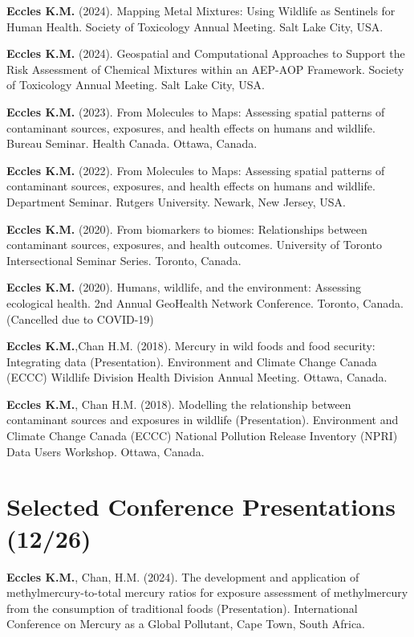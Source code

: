 \documentclass[margin,line]{res}
\begin{document}
\begin{resume}
\textbf{Eccles K.M.} (2024). Mapping Metal Mixtures: Using Wildlife as Sentinels for Human Health. Society of Toxicology Annual Meeting. Salt Lake City, USA.

\textbf{Eccles K.M.} (2024). Geospatial and Computational Approaches to Support the Risk Assessment of Chemical Mixtures within an AEP-AOP Framework. Society of Toxicology Annual Meeting. Salt Lake City, USA.

\textbf{Eccles K.M.} (2023). From Molecules to Maps: Assessing spatial patterns of contaminant sources, exposures, and health effects on humans and wildlife. Bureau Seminar. Health Canada. Ottawa, Canada.

\textbf{Eccles K.M.} (2022). From Molecules to Maps: Assessing spatial patterns of contaminant sources, exposures, and health effects on humans and wildlife. Department Seminar. Rutgers University. Newark, New Jersey, USA.

\textbf{Eccles K.M.} (2020). From biomarkers to biomes: Relationships between contaminant sources, exposures, and health outcomes. University of Toronto Intersectional Seminar Series. Toronto, Canada.

\textbf{Eccles K.M.} (2020). Humans, wildlife, and the environment: Assessing ecological health. 2nd Annual GeoHealth Network Conference. Toronto, Canada. (Cancelled due to COVID-19)

\textbf{Eccles K.M.},Chan H.M. (2018). Mercury in wild foods and food security: Integrating data (Presentation). Environment and Climate Change Canada (ECCC) Wildlife Division Health Division Annual Meeting. Ottawa, Canada.

\textbf{Eccles K.M.}, Chan H.M. (2018). Modelling the relationship between contaminant sources and exposures in wildlife (Presentation). Environment and Climate Change Canada (ECCC) National Pollution Release Inventory (NPRI) Data Users Workshop. Ottawa, Canada.

\vspace*{.1in}
\section{\sc Selected Conference Presentations (12/26)}

\textbf{Eccles K.M.}, Chan, H.M. (2024). The development and application of methylmercury-to-total mercury ratios for exposure assessment of methylmercury from the consumption of traditional foods (Presentation). International Conference on Mercury as a Global Pollutant, Cape Town, South Africa.


\end{resume}
\end{document}
